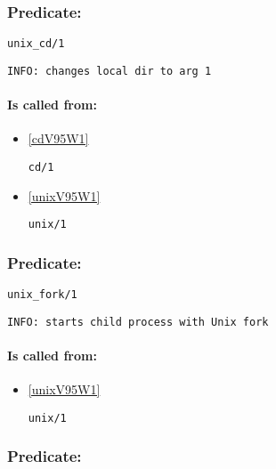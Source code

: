 \subsubsection{Predicate:} \label{unixV95WcdV95W1}

\begin{verbatim}
unix_cd/1
\end{verbatim}

{\small \begin{verbatim}
INFO: changes local dir to arg 1

\end{verbatim}}
\paragraph{Is called from:} 
\begin{itemize}
\item \ref{cdV95W1} 
\begin{verbatim}
cd/1
\end{verbatim}

\item \ref{unixV95W1} 
\begin{verbatim}
unix/1
\end{verbatim}

\end{itemize}

\subsubsection{Predicate:} \label{unixV95WforkV95W1}

\begin{verbatim}
unix_fork/1
\end{verbatim}

{\small \begin{verbatim}
INFO: starts child process with Unix fork

\end{verbatim}}
\paragraph{Is called from:} 
\begin{itemize}
\item \ref{unixV95W1} 
\begin{verbatim}
unix/1
\end{verbatim}

\end{itemize}

\subsubsection{Predicate:} \label{unixV95WgetenvV95W2}

